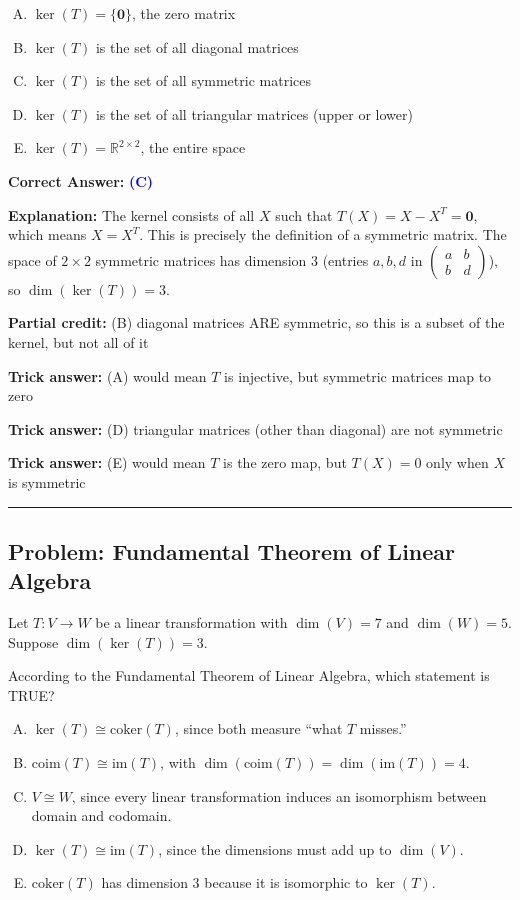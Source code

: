 \documentclass[12pt]{amsart}
\newcommand{\divider}{
  \vspace{-1em}
  \noindent
  \raisebox{-0.15ex}{\textbullet}%
  \hspace{0.5em}%
  \rule[0.5ex]{0.95\textwidth}{1.0pt}%
  \hspace{0.5em}%
  \raisebox{-0.15ex}{\textbullet}%
  \vspace{0em}
}
\begin{document}
\begin{enumerate}[(A)]
\item $\ker(T) = \{\mathbf{0}\}$, the zero matrix 
\item $\ker(T)$ is the set of all diagonal matrices
\item $\ker(T)$ is the set of all symmetric matrices
\item $\ker(T)$ is the set of all triangular matrices (upper or lower)
\item $\ker(T) = \mathbb{R}^{2 \times 2}$, the entire space
\end{enumerate}

\textbf{Correct Answer:} \textcolor{blue}{\textbf{(C)}}

\textbf{Explanation:} The kernel consists of all $X$ such that $T(X) = X - X^T = \mathbf{0}$, which means $X = X^T$. This is precisely the definition of a symmetric matrix. The space of $2 \times 2$ symmetric matrices has dimension 3 (entries $a, b, d$ in $\begin{pmatrix} a & b \\ b & d \end{pmatrix}$), so $\dim(\ker(T)) = 3$.

\textbf{Partial credit:} (B) diagonal matrices ARE symmetric, so this is a subset of the kernel, but not all of it

\textbf{Trick answer:} (A) would mean $T$ is injective, but symmetric matrices map to zero

\textbf{Trick answer:} (D) triangular matrices (other than diagonal) are not symmetric

\textbf{Trick answer:} (E) would mean $T$ is the zero map, but $T(X) = 0$ only when $X$ is symmetric

\divider

\subsection*{Problem: Fundamental Theorem of Linear Algebra}

Let $T: V \to W$ be a linear transformation with $\dim(V) = 7$ and $\dim(W) = 5$. Suppose $\dim(\ker(T)) = 3$.

According to the Fundamental Theorem of Linear Algebra, which statement is TRUE?

\begin{enumerate}[(A)]
\item $\ker(T) \cong \text{coker}(T)$, since both measure ``what $T$ misses.''
\item $\text{coim}(T) \cong \text{im}(T)$, with $\dim(\text{coim}(T)) = \dim(\text{im}(T)) = 4$.
\item $V \cong W$, since every linear transformation induces an isomorphism between domain and codomain.
\item $\ker(T) \cong \text{im}(T)$, since the dimensions must add up to $\dim(V)$.
\item $\text{coker}(T)$ has dimension 3 because it is isomorphic to $\ker(T)$.
\end{enumerate}
\end{document}
